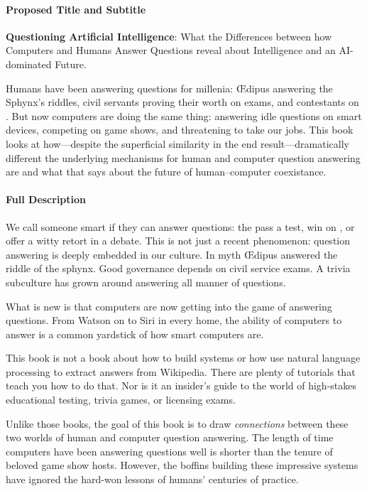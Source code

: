 
\paragraph{Proposed Title and Subtitle} \vspace{3cm}

{\bf Questioning Artificial Intelligence}: What the Differences between how
Computers and Humans Answer Questions reveal about Intelligence and an
AI-dominated Future.

\vspace{3cm}

Humans have been answering questions for millenia: \OE{}dipus answering the
Sphynx's riddles, civil servants proving their worth on exams, and contestants
on \jeopardyp{}.
%
But now computers are doing the same thing: answering idle questions on smart
devices, competing on game shows, and threatening to take our jobs.
%
This book looks at how---despite the superficial similarity in the end
result---dramatically different the underlying mechanisms for human and
computer question answering are and what that says about the future of
human--computer coexistance.

\paragraph{Full Description}

We call someone smart if they can answer questions: the pass a test, win
on \jeopardyp{}, or offer a witty retort in a debate.
%
This is not just a recent phenomenon: question answering is deeply embedded in
our culture.
%
In myth \OE{}dipus answered the riddle of the sphynx.
%
Good governance depends on civil service exams.
%
A trivia subculture has grown around answering all manner of questions.

What is new is that computers are now getting into the game of answering
questions.
%
From  Watson on \jeopardy{} to Siri in every home, the ability of
computers to answer is a common yardstick of how smart computers are.

This book is not a book about how to build  systems or how use natural
language processing to extract answers from Wikipedia.
%
There are plenty of tutorials that teach you how to do that.
%
Nor is it an insider's guide to the world of high-stakes educational testing,
trivia games, or licensing exams.

Unlike those books, the goal of this book is to draw \emph{connections}
between these two worlds of human and computer question answering.
%
The length of time computers have been answering questions well is shorter
than the tenure of beloved game show hosts.
%
However, the  boffins building these impressive systems have ignored
the hard-won lessons of humans' centuries of practice.


